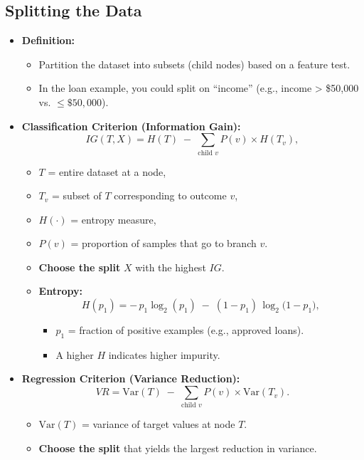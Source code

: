 \documentclass[10pt]{article}
\begin{document}
\subsection{Splitting the Data}
\begin{itemize}
    \item \textbf{Definition:}
    \begin{itemize}
        \item Partition the dataset into subsets (child nodes) based on a feature test.
        \item In the loan example, you could split on ``income'' (e.g., income > \$50{,}000 vs. \(\leq\$50{,}000\)).
    \end{itemize}

    \item \textbf{Classification Criterion (Information Gain):}
    \[
    IG(T, X) = H(T) \;-\; \sum_{\text{child } v} P(v) \times H(T_v),
    \]
    \begin{itemize}
        \item \(T\) = entire dataset at a node,
        \item \(T_v\) = subset of \(T\) corresponding to outcome \(v\),
        \item \(H(\cdot)\) = entropy measure,
        \item \(P(v)\) = proportion of samples that go to branch \(v\).
        \item \textbf{Choose the split} \(X\) with the highest \(IG\).
        \item \textbf{Entropy:}
        \[
        H(p_1) = -\,p_1 \log_2(p_1) \;-\; (1 - p_1)\,\log_2\bigl(1 - p_1\bigr),
        \]
        \begin{itemize}
            \item \(p_1\) = fraction of positive examples (e.g., approved loans).
            \item A higher \(H\) indicates higher impurity.
    \end{itemize}

    \end{itemize}

    \item \textbf{Regression Criterion (Variance Reduction):}
    \[
    VR = \mathrm{Var}(T) \;-\; \sum_{\text{child } v} P(v) \times \mathrm{Var}(T_v).
    \]
    \begin{itemize}
        \item \(\mathrm{Var}(T)\) = variance of target values at node \(T\).
        \item \textbf{Choose the split} that yields the largest reduction in variance.
    \end{itemize}


\end{itemize}
\end{document}
